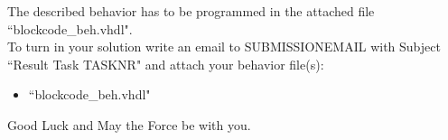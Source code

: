 \documentclass[a4paper,12pt]{article}
\begin{document}
\newpage

The described  behavior has to be programmed in the attached file ``blockcode\_beh.vhdl".\\

To turn in your solution write an email to {{SUBMISSIONEMAIL}} with Subject ``Result Task {{TASKNR}}" and attach your behavior file(s):
\begin{itemize}
\item ``blockcode\_beh.vhdl"
\end{itemize}

\vspace{0.7cm}
Good Luck and May the Force be with you.
\end{document}
